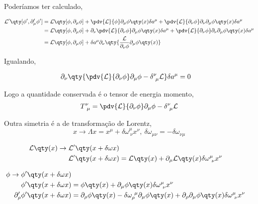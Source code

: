 \documentclass[twoside]{amsart}
\numberwithin{equation}{section}
\begin{document}
\begin{refsection}
Poderíamos ter calculado,

\begin{align}
    \mathcal L'\qty[\phi',\partial_\mu'\phi ']&=\mathcal L\qty[\phi,\partial_\mu\phi]+\pdv{\mathcal L}{\phi}\partial_\mu\phi\qty(x)\delta a^\mu
    +\pdv{\mathcal L}{\partial_\nu\phi}\partial_\nu\partial_\mu\phi\qty(x)\delta a^\mu\\
    &=\mathcal L\qty[\phi,\partial_\mu\phi]+\partial_\nu\pdv{\mathcal L}{\partial_\nu\phi}\partial_\mu\phi\qty(x)\delta a^\mu+
    \pdv{\mathcal L}{\partial_\nu\phi}\partial_\nu\partial_\mu\phi\qty(x)\delta a^\mu\\
    &=\mathcal L\qty[\phi,\partial_\mu\phi]+\delta a^\mu\partial_\nu\qty{\frac{\mathcal L}{\partial_\nu\phi}\partial_\mu\phi\qty(x)}
\end{align}

Igualando,

\begin{align}
    \partial_\nu\qty{\pdv{\mathcal L}{\partial_\nu\phi}\partial_\mu\phi-\delta^\nu_{\ \mu}\mathcal L}\delta a^\mu&=0
\end{align}

Logo a quantidade conservada é o tensor de energia momento, $$T^\nu_{\ \mu}=\pdv{\mathcal L}{\partial_\nu\phi}\partial_\mu\phi-\delta^\nu_{\ \mu}\mathcal L$$

Outra simetria é a de transformação de Lorentz, $$x\rightarrow \Lambda x=x^\mu+\delta\omega^\mu_{\ \nu}x^\nu,\ \delta\omega_{\mu\nu}=-\delta\omega_{\nu\mu}$$

\begin{align}
    \mathcal L\qty(x)\rightarrow\mathcal L'\qty(x+\delta\omega x)\\
    \mathcal L'\qty(x+\delta\omega x)&=\mathcal L\qty(x)+\partial_\mu\mathcal L\qty(x)\delta\omega^\mu_{\ \nu}x^\nu\\
\end{align}

\begin{align}
    \phi\rightarrow\phi'\qty(x+\delta\omega x)\\
    \phi'\qty(x+\delta\omega x)&=\phi\qty(x)+\partial_\mu\phi\qty(x)\delta\omega^{\mu}_{\ \nu}x^\nu\\
    \partial_\rho'\phi'\qty(x+\delta\omega x)&=\partial_\rho\phi\qty(x)-\delta\omega_{\rho}^{\ \mu}\partial_\mu\phi\qty(x)+\partial_\rho\partial_\mu\phi\qty(x)\delta\omega^{\mu}_{\ \nu}x^\nu
\end{align}


\end{refsection}
\end{document}
